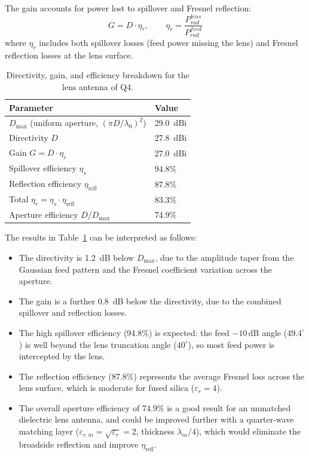 \documentclass{article}
\begin{document}
The gain accounts for power lost to spillover and Fresnel reflection:
\begin{equation}\label{eq:gain}
G = D \cdot \eta_r, \qquad \eta_r = \frac{P^{lens}_{rad}}{P^{feed}_{rad}}
\end{equation}
where $\eta_r$ includes both spillover losses (feed power missing the lens) and Fresnel reflection losses at the lens surface.

\begin{table}[H]
\centering
\caption{Directivity, gain, and efficiency breakdown for the lens antenna of Q4.}
\label{tab:q6}
\begin{tabular}{@{}ll@{}}
\toprule
Parameter & Value \\
\midrule
$D_{\max}$ (uniform aperture, $(\pi D/\lambda_0)^2$) & \SI{29.0}{dBi} \\
Directivity $D$ & \SI{27.8}{dBi} \\
Gain $G = D \cdot \eta_r$ & \SI{27.0}{dBi} \\
\midrule
Spillover efficiency $\eta_s$ & 94.8\% \\
Reflection efficiency $\eta_{\text{refl}}$ & 87.8\% \\
Total $\eta_r = \eta_s \cdot \eta_{\text{refl}}$ & 83.3\% \\
Aperture efficiency $D/D_{\max}$ & 74.9\% \\
\bottomrule
\end{tabular}
\end{table}

The results in Table~\ref{tab:q6} can be interpreted as follows:
\begin{itemize}
\item The directivity is \SI{1.2}{dB} below $D_{\max}$, due to the amplitude taper from the Gaussian feed pattern and the Fresnel coefficient variation across the aperture.

\item The gain is a further \SI{0.8}{dB} below the directivity, due to the combined spillover and reflection losses.

\item The high spillover efficiency (94.8\%) is expected: the feed $-10$\,dB angle ($49.4^\circ$) is well beyond the lens truncation angle ($40^\circ$), so most feed power is intercepted by the lens.

\item The reflection efficiency (87.8\%) represents the average Fresnel loss across the lens surface, which is moderate for fused silica ($\varepsilon_r = 4$).

\item The overall aperture efficiency of 74.9\% is a good result for an unmatched dielectric lens antenna, and could be improved further with a quarter-wave matching layer ($\varepsilon_{r,m} = \sqrt{\varepsilon_r} = 2$, thickness $\lambda_m/4$), which would eliminate the broadside reflection and improve $\eta_{\text{refl}}$.
\end{itemize}
\end{document}
